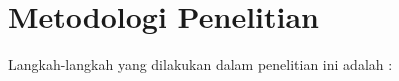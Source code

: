 

\section{Metodologi Penelitian}

Langkah-langkah yang dilakukan dalam penelitian ini adalah :
\begin{enumerate}

\end{enumerate}
